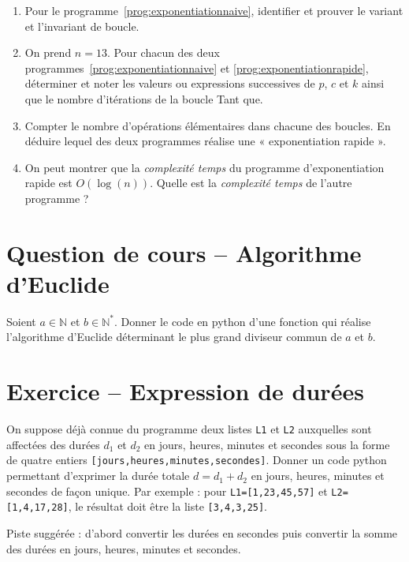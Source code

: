 \begin{enumerate}

\item Pour le programme~\ref{prog:exponentiationnaive}, identifier et prouver le variant et l'invariant de boucle.

\item On prend $n=13$. Pour chacun des deux programmes~\ref{prog:exponentiationnaive} et \ref{prog:exponentiationrapide}, déterminer et noter les valeurs ou expressions successives de $p$, $c$ et $k$ ainsi que le nombre d'itérations de la boucle Tant que.  

\item Compter le nombre d'opérations élémentaires dans chacune des boucles. En déduire lequel des deux programmes réalise une « exponentiation rapide ». 

\item On peut montrer que la \textit{complexité temps} du programme d'exponentiation rapide est $O(\log(n))$. Quelle est la \textit{complexité temps} de l'autre programme ?

\end{enumerate}

\section{Question de cours -- Algorithme d'Euclide}

Soient $a \in \mathbb N$ et $b \in \mathbb N^*$. Donner le code en python d'une fonction qui réalise l'algorithme d'Euclide déterminant le plus grand diviseur commun de $a$ et $b$.

\section{Exercice -- Expression de durées}

On suppose déjà connue du programme deux listes \texttt{L1} et \texttt{L2} auxquelles sont affectées des durées $d_1$ et $d_2$ en jours, heures, minutes et secondes sous la forme de quatre entiers \texttt{[jours,heures,minutes,secondes]}. Donner un code python permettant d'exprimer la durée totale $d=d_1+d_2$ en jours, heures, minutes et secondes de façon unique. Par exemple : pour \texttt{L1=[1,23,45,57]} et \texttt{L2=[1,4,17,28]}, le résultat doit être la liste \texttt{[3,4,3,25]}.

Piste suggérée : d'abord convertir les durées en secondes puis convertir la somme des durées en jours, heures, minutes et secondes.




